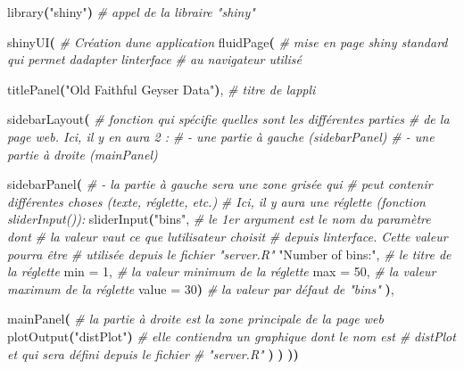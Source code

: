 \documentclass[
]{book}
\newenvironment{Shaded}{\begin{snugshade}}{\end{snugshade}}
\newcommand{\CommentTok}[1]{\textcolor[rgb]{0.56,0.35,0.01}{\textit{#1}}}
\newcommand{\ErrorTok}[1]{\textcolor[rgb]{0.64,0.00,0.00}{\textbf{#1}}}
\newcommand{\ExtensionTok}[1]{#1}
\newcommand{\KeywordTok}[1]{\textcolor[rgb]{0.13,0.29,0.53}{\textbf{#1}}}
\newcommand{\NormalTok}[1]{#1}
\newcommand{\StringTok}[1]{\textcolor[rgb]{0.31,0.60,0.02}{#1}}
\theoremstyle{definition}
\theoremstyle{definition}
\theoremstyle{definition}
\theoremstyle{definition}
\theoremstyle{remark}
\begin{document}
\begin{Shaded}
\begin{Highlighting}[]
\ExtensionTok{library}\ErrorTok{(}\StringTok{"shiny"}\KeywordTok{)}  \CommentTok{\# appel de la libraire "shiny"}

\ExtensionTok{shinyUI}\ErrorTok{(} \CommentTok{\# Création d\textquotesingle{}une application}
 \ExtensionTok{fluidPage}\ErrorTok{(} \CommentTok{\# mise en page shiny standard qui permet d\textquotesingle{}adapter l\textquotesingle{}interface}
            \CommentTok{\# au navigateur utilisé}
            
  \ExtensionTok{titlePanel}\ErrorTok{(}\StringTok{"Old Faithful Geyser Data"}\KeywordTok{)}\ExtensionTok{,} \CommentTok{\# titre de l\textquotesingle{}appli}
  
   \ExtensionTok{sidebarLayout}\ErrorTok{(}  \CommentTok{\# fonction qui spécifie quelles sont les différentes parties  }
                   \CommentTok{\# de la page web. Ici, il y en aura 2 :}
                   \CommentTok{\# {-} une partie à gauche (sidebarPanel)}
                   \CommentTok{\# {-} une partie à droite (mainPanel)}
                   
    \ExtensionTok{sidebarPanel}\ErrorTok{(}  \CommentTok{\# {-} la partie à gauche sera une zone grisée qui  }
                   \CommentTok{\# peut contenir différentes choses (texte, réglette, etc.)}
                   \CommentTok{\# Ici, il y aura une réglette (fonction sliderInput()):}
       \ExtensionTok{sliderInput}\ErrorTok{(}\StringTok{"bins"}\ExtensionTok{,} \CommentTok{\# le 1er argument est le nom du paramètre dont  }
                           \CommentTok{\# la valeur vaut ce que l\textquotesingle{}utilisateur choisit }
                           \CommentTok{\# depuis l\textquotesingle{}interface. Cette valeur pourra être }
                           \CommentTok{\# utilisée depuis le fichier "server.R"}
                   \StringTok{"Number of bins:"}\ExtensionTok{,}   \CommentTok{\# le titre de la réglette}
                   \ExtensionTok{min}\NormalTok{ = 1,             }\CommentTok{\# la valeur minimum de la réglette}
                   \ExtensionTok{max}\NormalTok{ = 50,            }\CommentTok{\# la valeur maximum de la réglette}
                   \ExtensionTok{value}\NormalTok{ = 30}\KeywordTok{)}          \CommentTok{\# la valeur par défaut de "bins"}
    \KeywordTok{)}\ExtensionTok{,}
    
    \ExtensionTok{mainPanel}\ErrorTok{(} \CommentTok{\# la partie à droite est la zone principale de la page web }
       \ExtensionTok{plotOutput}\ErrorTok{(}\StringTok{"distPlot"}\KeywordTok{)} \CommentTok{\# elle contiendra un graphique dont le nom est }
                              \CommentTok{\# distPlot et qui sera défini depuis le fichier}
                              \CommentTok{\# "server.R"}
    \KeywordTok{)}
  \KeywordTok{)}
\KeywordTok{))}
\end{Highlighting}
\end{Shaded}
\end{document}
